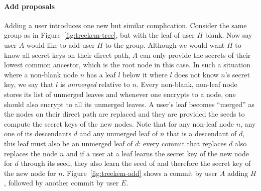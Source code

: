 \paragraph{Add proposals} Adding a user introduces one new but similar complication. Consider the same group as in Figure~\ref{fig:treekem-tree}, but with the leaf of user $H$ blank. Now say user $A$ would like to add user $H$ to the group. Although we would want $H$ to know all secret keys on their direct path, $A$ can only provide the secrets of their lowest common ancestor, which is the root node in this case.
In such a situation where a non-blank node $n$ has a leaf $l$ below it where $l$ does not know $n$'s secret key, we say that $l$ is \emph{unmerged} relative to $n$. Every non-blank, non-leaf node stores its list of unmerged leaves and whenever one encrypts to a node, one should also encrypt to all its unmerged leaves. A user's leaf becomes ``merged'' as the nodes on their direct path are replaced and they are provided the seeds to compute the secret keys of the new nodes.
Note that for any non-leaf node $n$, any one of its descendants $d$ and any unmerged leaf of $n$ that is a descendant of $d$, this leaf must also be an unmerged leaf of $d$: every commit that replaces $d$ also replaces the node $n$ and if a user at a leaf learns the secret key of the new node for $d$ through its seed, they also learn the seed of and therefore the secret key of the new node for $n$. Figure~\ref{fig:treekem-add} shows a commit by user $A$ adding $H$, followed by another commit by user $E$.

